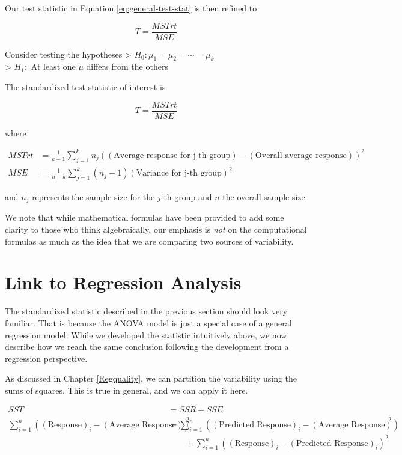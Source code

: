 \documentclass[]{book}
\theoremstyle{plain}
\theoremstyle{mydefn}
\theoremstyle{myexmpl}
\theoremstyle{remark}
\let\BeginKnitrBlock\begin \let\EndKnitrBlock\end
\let\BeginKnitrBlock\begin \let\EndKnitrBlock\end
\begin{document}
Our test statistic in Equation \eqref{eq:general-test-stat} is then
refined to

\begin{equation}
  T = \frac{MSTrt}{MSE}
  \label{eq:anova-test-stat}
\end{equation}

\BeginKnitrBlock{rmdtip}
Consider testing the hypotheses \textgreater{}
\(H_0: \mu_1 = \mu_2 = \dotsb = \mu_k\)\\
\textgreater{} \(H_1:\) At least one \(\mu\) differs from the others

The standardized test statistic of interest is

\[
  T = \frac{MSTrt}{MSE}
\]

where

\[
\begin{aligned}
  MSTrt &= \frac{1}{k-1} \sum_{j=1}^{k} n_j \left((\text{Average response for j-th group}) - (\text{Overall average response})\right)^2 \\
  MSE &= \frac{1}{n-k} \sum_{j=1}^{k} \left(n_j - 1\right) (\text{Variance for j-th group})^2
\end{aligned}
\]

and \(n_j\) represents the sample size for the \(j\)-th group and \(n\)
the overall sample size.
\EndKnitrBlock{rmdtip}

We note that while mathematical formulas have been provided to add some
clarity to those who think algebraically, our emphasis is \emph{not} on
the computational formulas as much as the idea that we are comparing two
sources of variability.

\section{Link to Regression Analysis}\label{link-to-regression-analysis}

The standardized statistic described in the previous section should look
very familiar. That is because the ANOVA model is just a special case of
a general regression model. While we developed the statistic intuitively
above, we now describe how we reach the same conclusion following the
development from a regression perspective.

As discussed in Chapter \ref{Regquality}, we can partition the
variability using the sums of squares. This is true in general, and we
can apply it here.

\[
\begin{aligned}
  SST &= SSR + SSE \\
  \sum_{i=1}^{n} \left((\text{Response})_i - (\text{Average Response})\right)^2 &=
    \sum_{i=1}^{n} \left((\text{Predicted Response})_i - (\text{Average Response})\right)^2 \\
    &\qquad + \sum_{i=1}^{n} \left((\text{Response})_i - (\text{Predicted Response})_i\right)^2
\end{aligned}
\]
\end{document}
